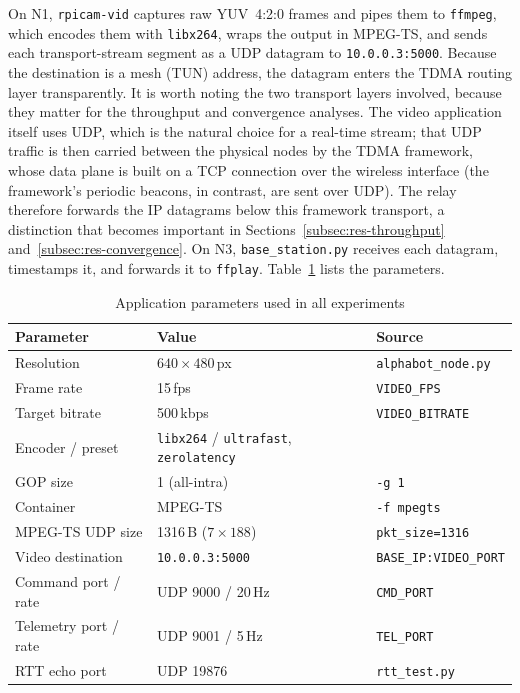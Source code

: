 On N1, \texttt{rpicam-vid} captures raw YUV~4:2:0 frames and pipes them to
\texttt{ffmpeg}, which encodes them with \texttt{libx264}, wraps the output in
MPEG-TS, and sends each transport-stream segment as a UDP datagram to
\texttt{10.0.0.3:5000}. Because the destination is a mesh (TUN) address, the
datagram enters the TDMA routing layer transparently. It is worth noting the
two transport layers involved, because they matter for the throughput and
convergence analyses. The video application itself uses UDP, which is the
natural choice for a real-time stream; that UDP traffic is then carried between
the physical nodes by the TDMA framework, whose data plane is built on a TCP
connection over the wireless interface (the framework's periodic beacons, in
contrast, are sent over UDP). The relay therefore forwards the IP datagrams
below this framework transport, a distinction that becomes important in
Sections~\ref{subsec:res-throughput} and~\ref{subsec:res-convergence}. On N3,
\texttt{base\_station.py} receives each datagram, timestamps it, and forwards
it to \texttt{ffplay}. Table~\ref{tab:app-params} lists the parameters.

\begin{table}[h]
\centering
\caption{Application parameters used in all experiments}
\label{tab:app-params}
\begin{tabular}{lll}
\toprule
\textbf{Parameter} & \textbf{Value} & \textbf{Source} \\
\midrule
Resolution            & $640 \times 480$\,px  & \texttt{alphabot\_node.py} \\
Frame rate            & 15\,fps               & \texttt{VIDEO\_FPS} \\
Target bitrate        & 500\,kbps             & \texttt{VIDEO\_BITRATE} \\
Encoder / preset      & \texttt{libx264} / \texttt{ultrafast}, \texttt{zerolatency} & \\
GOP size              & 1 (all-intra)         & \texttt{-g 1} \\
Container             & MPEG-TS               & \texttt{-f mpegts} \\
MPEG-TS UDP size      & 1316\,B ($7\times188$)& \texttt{pkt\_size=1316} \\
Video destination     & \texttt{10.0.0.3:5000}& \texttt{BASE\_IP:VIDEO\_PORT} \\
Command port / rate   & UDP 9000 / 20\,Hz     & \texttt{CMD\_PORT} \\
Telemetry port / rate & UDP 9001 / 5\,Hz      & \texttt{TEL\_PORT} \\
RTT echo port         & UDP 19876             & \texttt{rtt\_test.py} \\
\bottomrule
\end{tabular}
\end{table}

